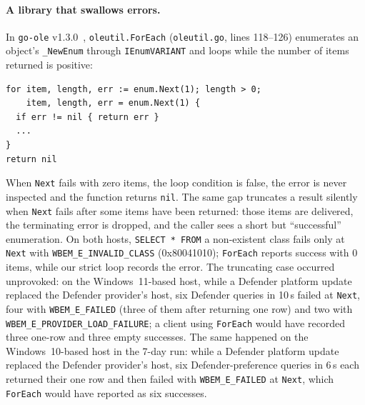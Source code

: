 \documentclass[letterpaper,twocolumn,10pt]{article}
\newcommand{\code}[1]{\texttt{\small #1}}
\newcommand{\hr}[1]{\texttt{\small #1}}
\begin{document}
\paragraph{A library that swallows errors.}
In \texttt{go-ole} v1.3.0~\cite{go-ole}, \code{oleutil.ForEach} (\code{oleutil.go}, lines 118--126) enumerates an object's \code{\_NewEnum} through \code{IEnumVARIANT} and loops while the number of items returned is positive:
\begin{lstlisting}[firstnumber=118]
for item, length, err := enum.Next(1); length > 0;
    item, length, err = enum.Next(1) {
  if err != nil { return err }
  ...
}
return nil
\end{lstlisting}
When \code{Next} fails with zero items, the loop condition is false, the error is never inspected and the function returns \code{nil}.
The same gap truncates a result silently when \code{Next} fails after some items have been returned: those items are delivered, the terminating error is dropped, and the caller sees a short but ``successful'' enumeration.
On both hosts, \code{SELECT * FROM} a non-existent class fails only at \code{Next} with \hr{WBEM\_E\_INVALID\_CLASS} (0x80041010); \code{ForEach} reports success with 0 items, while our strict loop records the error.
The truncating case occurred unprovoked: on the Windows~11-based host, while a Defender platform update replaced the Defender provider's host, six Defender queries in 10\,s failed at \code{Next}, four with \hr{WBEM\_E\_FAILED} (three of them after returning one row) and two with \hr{WBEM\_E\_PROVIDER\_LOAD\_FAILURE}; a client using \code{ForEach} would have recorded three one-row and three empty successes.
The same happened on the Windows~10-based host in the 7-day run: while a Defender platform update replaced the Defender provider's host, six Defender-preference queries in 6\,s each returned their one row and then failed with \hr{WBEM\_E\_FAILED} at \code{Next}, which \code{ForEach} would have reported as six successes.
\end{document}
